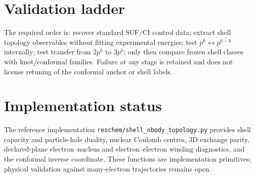 \section{Validation ladder}
The required order is: recover standard SCF/CI control data; extract shell topology observables without fitting experimental energies; test $p^k\leftrightarrow p^{6-k}$ internally; test transfer from $2p^k$ to $3p^k$; only then compare frozen shell classes with knot/conformal families. Failure at any stage is retained and does not license retuning of the conformal anchor or shell labels.

\section{Implementation status}
The reference implementation \texttt{reschem/shell\_nbody\_topology.py} provides shell capacity and particle-hole duality, nuclear Coulomb centres, 3D exchange parity, declared-plane electron--nucleus and electron--electron winding diagnostics, and the conformal inverse coordinate. These functions are implementation primitives; physical validation against many-electron trajectories remains open.
